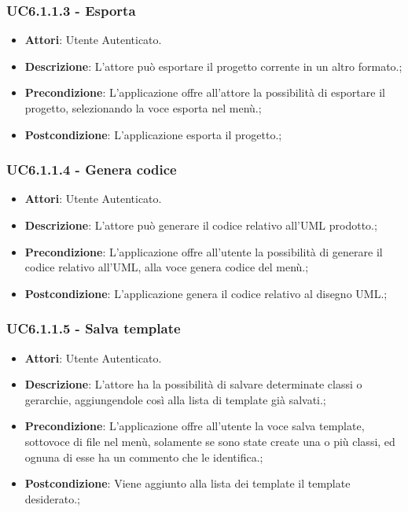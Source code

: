 \subsubsection{UC6.1.1.3 - Esporta} 
\label{sssec:UC6.1.1.3} 
\begin{itemize} 
\item \textbf{Attori}: Utente Autenticato.
\item \textbf{Descrizione}: L’attore può esportare il progetto corrente in
un altro formato.;
\item \textbf{Precondizione}: L’applicazione offre all’attore la possibilità di esportare il progetto,
selezionando la voce esporta nel menù.;
\item \textbf{Postcondizione}: L’applicazione esporta il progetto.;
\end{itemize} 
\subsubsection{UC6.1.1.4 - Genera codice} 
\label{sssec:UC6.1.1.4} 
\begin{itemize} 
\item \textbf{Attori}: Utente Autenticato.
\item \textbf{Descrizione}: L’attore può generare il codice relativo all’UML
prodotto.;
\item \textbf{Precondizione}: L’applicazione offre all’utente la possibilità di generare il codice
relativo all’UML, alla voce genera codice del menù.;
\item \textbf{Postcondizione}: L’applicazione genera il codice relativo al disegno UML.;
\end{itemize} 
\subsubsection{UC6.1.1.5 - Salva template} 
\label{sssec:UC6.1.1.5} 
\begin{itemize} 
\item \textbf{Attori}: Utente Autenticato.
\item \textbf{Descrizione}: L’attore ha la possibilità di salvare determinate classi o gerarchie, aggiungendole così alla lista di template già salvati.;
\item \textbf{Precondizione}: L’applicazione offre all’utente la voce salva template, sottovoce di file nel menù, solamente se sono state create una o più classi, ed ognuna di esse ha un commento che le identifica.;
\item \textbf{Postcondizione}: Viene aggiunto alla lista dei template il template desiderato.;
\end{itemize} 

